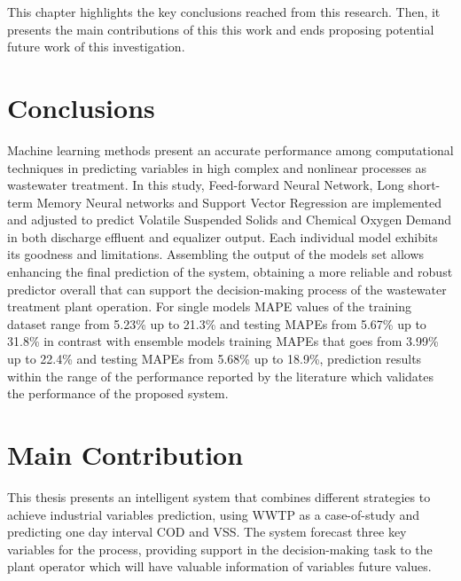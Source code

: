 This chapter highlights the key conclusions reached from this research. Then, it presents the main contributions of this this work and ends proposing potential future work of this investigation. 

\section{Conclusions}

Machine learning methods present an accurate performance among computational techniques in predicting variables in high complex and nonlinear processes as wastewater treatment. In this study, Feed-forward Neural Network, Long short-term Memory Neural networks and Support Vector Regression are implemented and adjusted to predict Volatile Suspended Solids and Chemical Oxygen Demand in both discharge effluent and equalizer output. Each individual model exhibits its goodness and limitations. Assembling the output of the models set allows enhancing the final prediction of the system, obtaining a more reliable and robust predictor overall that can support the decision-making process of the wastewater treatment plant operation. For single models \ac{MAPE} values of the training dataset range from 5.23\% up to 21.3\% and testing \ac{MAPE}s from 5.67\% up to 31.8\% in contrast with ensemble models training \ac{MAPE}s that goes from 3.99\% up to 22.4\% and testing \ac{MAPE}s from 5.68\% up to 18.9\%, prediction results within the range of the performance reported by the literature which validates the performance of the proposed system. 


\section{Main Contribution}

This thesis presents an intelligent system that combines different strategies to achieve industrial variables prediction, using WWTP as a case-of-study and predicting one day interval COD and VSS. The system forecast three key variables for the process, providing support in the decision-making task to the plant operator which will have valuable information of variables future values.

